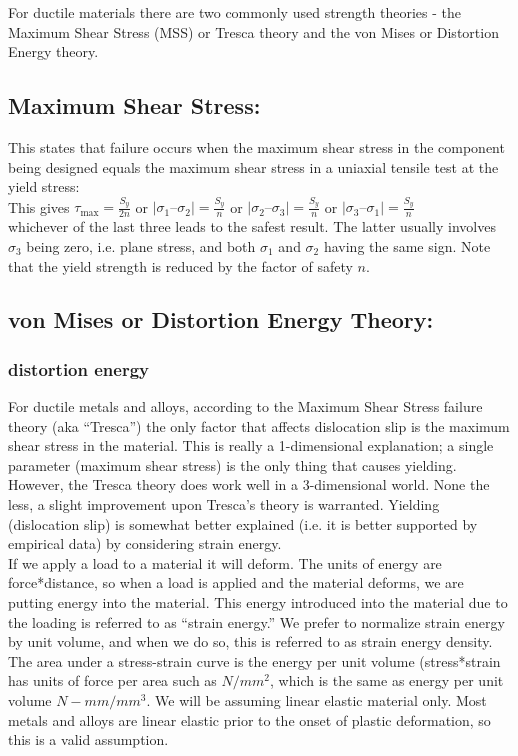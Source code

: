 For ductile materials there are two commonly used strength theories - the Maximum Shear Stress (MSS) or Tresca theory and the von Mises or Distortion Energy theory.

\subsection{Maximum Shear Stress:}
This states that failure occurs when the maximum shear stress in the component
being designed equals the maximum shear stress in a uniaxial tensile test at the
yield stress:\\

This gives $ \tau_{\max} = \frac{S_y}{2n} $ or $ | \sigma_1 – \sigma_2 | = \frac{S_y}{n} $ or $ | \sigma_2 – \sigma_3 | = \frac{S_y}{n} $ or $ | \sigma_3 – \sigma_1 | = \frac{S_y}{n} $ \\

whichever of the last three leads to the safest result. The latter usually involves $ \sigma_3 $ being zero, i.e. plane stress, and both $ \sigma_1 $ and $ \sigma_2 $ having the same sign. Note that the yield strength is reduced by the factor of safety $ n $.

\subsection{von Mises or Distortion Energy Theory:}
\subsubsection{distortion energy}
For ductile metals and alloys, according to the Maximum Shear Stress failure theory (aka “Tresca”) the only factor that affects dislocation slip is the maximum shear stress in the material. This is really a 1-dimensional explanation; a single parameter (maximum shear stress) is the only thing that causes yielding. However, the Tresca theory does work well in a 3-dimensional world. None the less, a slight improvement upon Tresca’s theory is warranted. Yielding (dislocation slip) is somewhat better explained (i.e. it is better supported by empirical data) by considering strain energy. \\

If we apply a load to a material it will deform. The units of energy are force*distance, so when a load is applied and the material deforms, we are putting energy into the material. This energy introduced into the material due to the loading is referred to as “strain energy.” We prefer to normalize strain energy by unit volume, and when we do so, this is referred to as strain energy density. The area under a stress-strain curve is the energy per unit volume (stress*strain has
units of force per area such as $ N/mm^2 $, which is the same as energy per unit volume $ N-mm/mm^3 $. We will be assuming linear elastic material only. Most metals and alloys are linear elastic prior to the onset of plastic deformation, so this is a valid assumption. \\

